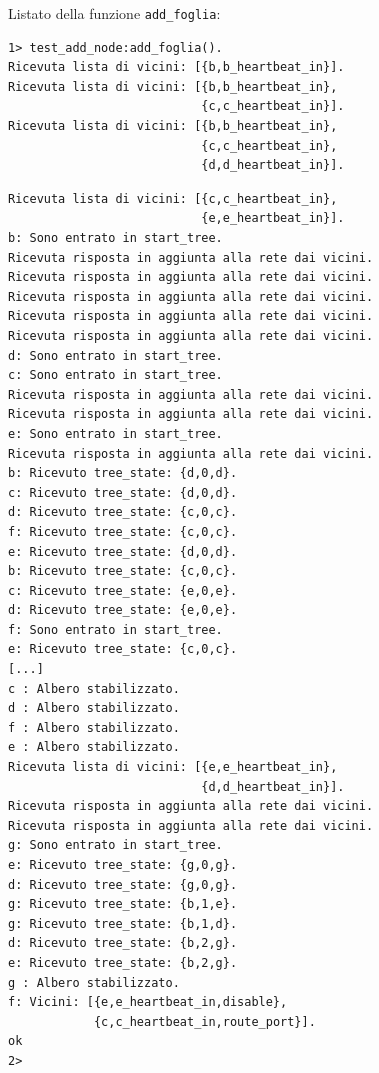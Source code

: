 \documentclass[italian]{memoir}
\begin{document}
Listato della funzione \texttt{add\_foglia}:
\begin{tcolorbox}[colback=yellow!5!white,colframe=cyan!75!black,title=funzione \texttt{add\_foglia} (1)]
\begin{center}
\begin{verbatim}
1> test_add_node:add_foglia(). 
Ricevuta lista di vicini: [{b,b_heartbeat_in}].
Ricevuta lista di vicini: [{b,b_heartbeat_in},
                           {c,c_heartbeat_in}].
Ricevuta lista di vicini: [{b,b_heartbeat_in},
                           {c,c_heartbeat_in},
                           {d,d_heartbeat_in}].
\end{verbatim}
\end{center}
\end{tcolorbox}
\begin{tcolorbox}[colback=yellow!5!white,colframe=cyan!75!black,title=funzione \texttt{add\_foglia} (2)]
\begin{center}
\begin{verbatim}
Ricevuta lista di vicini: [{c,c_heartbeat_in},
                           {e,e_heartbeat_in}].
b: Sono entrato in start_tree.
Ricevuta risposta in aggiunta alla rete dai vicini.
Ricevuta risposta in aggiunta alla rete dai vicini.
Ricevuta risposta in aggiunta alla rete dai vicini.
Ricevuta risposta in aggiunta alla rete dai vicini.
Ricevuta risposta in aggiunta alla rete dai vicini.
d: Sono entrato in start_tree.
c: Sono entrato in start_tree.
Ricevuta risposta in aggiunta alla rete dai vicini.
Ricevuta risposta in aggiunta alla rete dai vicini.
e: Sono entrato in start_tree.
Ricevuta risposta in aggiunta alla rete dai vicini.
b: Ricevuto tree_state: {d,0,d}.
c: Ricevuto tree_state: {d,0,d}.
d: Ricevuto tree_state: {c,0,c}.
f: Ricevuto tree_state: {c,0,c}.
e: Ricevuto tree_state: {d,0,d}.
b: Ricevuto tree_state: {c,0,c}.
c: Ricevuto tree_state: {e,0,e}.
d: Ricevuto tree_state: {e,0,e}.
f: Sono entrato in start_tree.
e: Ricevuto tree_state: {c,0,c}.
[...]
c : Albero stabilizzato.
d : Albero stabilizzato.
f : Albero stabilizzato.
e : Albero stabilizzato.
Ricevuta lista di vicini: [{e,e_heartbeat_in},
                           {d,d_heartbeat_in}].
Ricevuta risposta in aggiunta alla rete dai vicini.
Ricevuta risposta in aggiunta alla rete dai vicini.
g: Sono entrato in start_tree.
e: Ricevuto tree_state: {g,0,g}.
d: Ricevuto tree_state: {g,0,g}.
g: Ricevuto tree_state: {b,1,e}.
g: Ricevuto tree_state: {b,1,d}.
d: Ricevuto tree_state: {b,2,g}.
e: Ricevuto tree_state: {b,2,g}.
g : Albero stabilizzato.
f: Vicini: [{e,e_heartbeat_in,disable},
            {c,c_heartbeat_in,route_port}].
ok
2> 
\end{verbatim}
\end{center}
\end{tcolorbox}
\end{document}

